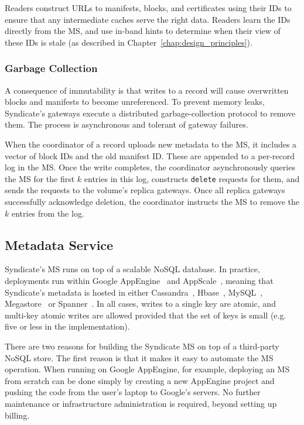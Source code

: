 Readers construct URLs to manifests, blocks, and certificates using their IDs to
ensure that any intermediate caches serve the right data.  Readers learn the IDs
directly from the MS, and use in-band hints to determine when their view of
these IDs is stale (as described in Chapter~\ref{chap:design_principles}).

\subsubsection{Garbage Collection}

A consequence of immutability is that writes to a record will cause
overwritten blocks and manifests to become unreferenced.  To prevent memory leaks, Syndicate's gateways
execute a distributed garbage-collection protocol to remove them.  The process
is asynchronous and tolerant of gateway failures.

When the coordinator of a record uploads new metadata to the MS, it includes a
vector of block IDs and the old manifest ID.  These are appended to a per-record
log in the MS.  Once the write completes, the coordinator asynchronously queries
the MS for the first $k$ entries in this log, constructs \texttt{delete}
requests for them, and sends the requests to the volume's replica gateways.
Once all replica gateways successfully acknowledge deletion, the coordinator
instructs the MS to remove the $k$ entries from the log.

\subsection{Metadata Service}

Syndicate's MS runs on top of a scalable NoSQL database.  In practice, 
deployments run within Google AppEngine~\cite{google-appengine} and
AppScale~\cite{appscale}, meaning that
Syndicate's metadata is hosted in either Cassandra~\cite{cassandra},
Hbase~\cite{hbase}, MySQL~\cite{mysql}, Megastore~\cite{megastore} or
Spanner~\cite{spanner}.  In all cases, writes to a single key are atomic, and
multi-key atomic writes are allowed provided that the set of keys is small (e.g.
five or less in the implementation).

There are two reasons for building the Syndicate MS on top of a third-party NoSQL store.
The first reason is that it makes it easy to automate the MS operation.
When running on Google AppEngine, for example, deploying an MS from
scratch can be done simply by creating a new AppEngine project and pushing the
code from the user's laptop to Google's servers.  No further maintenance or
infrastructure administration is required, beyond setting up billing.

